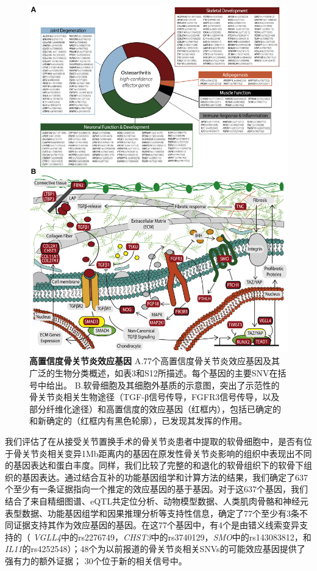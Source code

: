 \begin{figure}[!htbp]
	\centering
	\includegraphics[width=\textwidth]{./figures/Appendix/3.jpg}
	\caption{\textbf{高置信度骨关节炎效应基因} A.77个高置信度骨关节炎效应基因及其广泛的生物分类概述，如表3和S12所描述。每个基因的主要SNV在括号中给出。
    B.软骨细胞及其细胞外基质的示意图，突出了示范性的骨关节炎相关生物途径（TGF-β信号传导，FGFR3信号传导，以及部分纤维化途径）和高置信度的效应基因（红框内），包括已确定的和新确定的（红框内有黑色轮廓），已发现其发挥的作用。
    }
    \label{fig:app_3}
\end{figure}
我们评估了在从接受关节置换手术的骨关节炎患者中提取的软骨细胞中，是否有位于骨关节炎相关变异1Mb距离内的基因在原发性骨关节炎影响的组织中表现出不同的基因表达和蛋白丰度。同样，我们比较了完整的和退化的软骨组织下的软骨下组织的基因表达。通过结合互补的功能基因组学和计算方法的结果，我们确定了637个至少有一条证据指向一个推定的效应基因的基于基因。对于这637个基因，我们结合了来自精细图谱、eQTL共定位分析、动物模型数据、人类肌肉骨骼和神经元表型数据、功能基因组学和因果推理分析等支持性信息，确定了77个至少有3条不同证据支持其作为效应基因的基因。在这77个基因中，有4个是由错义线索变异支持的（\emph{
VGLL4}中的rs2276749，\emph{CHST3}中的rs3740129，\emph{SMO}中的rs143083812，和\emph{IL11}的rs4252548）；48个为以前报道的骨关节炎相关SNVs的可能效应基因提供了强有力的额外证据；
30个位于新的相关信号中。

